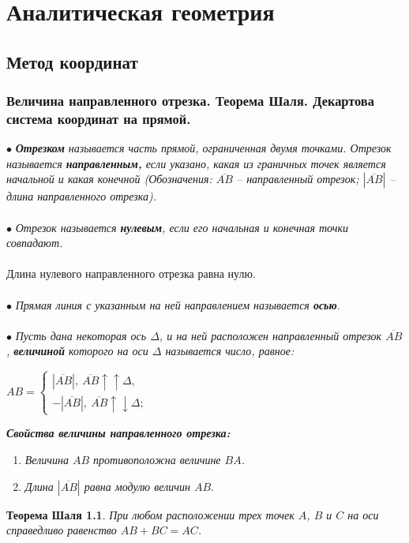 \part{Аналитическая геометрия}
\chapter{Метод координат}
\section{Величина направленного отрезка. Теорема Шаля. Декартова система
	координат на прямой.}
$\bullet$ \textit{\textbf{Отрезком} называется часть прямой, ограниченная двумя точками. Отрезок называется \textbf{направленным,} если указано, какая из граничных точек является начальной и какая
	конечной (Обозначения: $\overline{AB}$ – направленный отрезок; $| \overline{AB} |$ – длина направленного отрезка).} \\\\
$\bullet$ \textit{Отрезок называется \textbf{нулевым}, если его начальная и конечная точки совпадают.}\\\\
Длина нулевого направленного отрезка равна нулю.\\\\
$\bullet$ \textit{Прямая линия с указанным на ней направлением называется \textbf{осью}}.\\\\
$\bullet$ \textit{Пусть дана некоторая ось $\Delta$, и на ней расположен направленный отрезок $\overline{AB}$, \textbf{величиной} которого на оси $\Delta$ называется число, равное:}\begin{center}
	$AB = \begin{cases}
		|\overline{AB}|,\ \overline{AB} \uparrow \uparrow \Delta,\\
		-|\overline{AB}|,\ \overline{AB} \uparrow \downarrow \Delta;
	\end{cases}$
\end{center}
\textbf{\textit{Свойства величины направленного отрезка:}}\begin{enumerate}
	\item \textit{Величина $AB$ противоположна величине $BA$.}
	\item \textit{Длина $|\overline{AB}|$ равна модулю величин $AB$}.
\end{enumerate}
\newtheorem*{t1_1}{Теорема Шаля}\begin{t1_1}При любом расположении трех точек $A$, $B$ и $C$ на оси справедливо равенство $AB + BC = AC$.
\end{t1_1}
